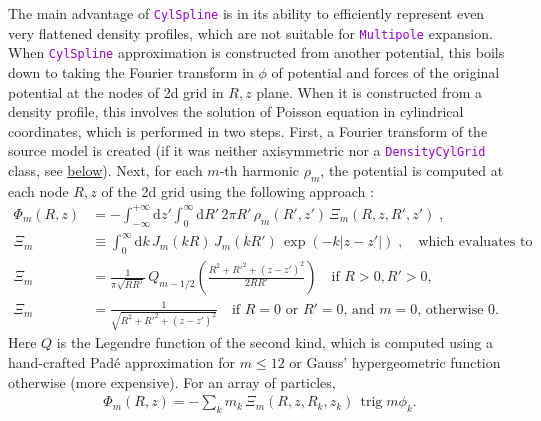 \documentclass[12pt]{article}
\newcommand{\ttt}[1]{\textcolor{darkviolet}{\texttt{#1}}}
\renewcommand{\d}{\mathrm{d}}
\DeclareMathOperator{\trig}{trig}
\begin{document}
The main advantage of \ttt{CylSpline} is in its ability to efficiently represent even very flattened density profiles, which are not suitable for \ttt{Multipole} expansion. When \ttt{CylSpline} approximation is constructed from another potential, this boils down to taking the Fourier transform in $\phi$ of potential and forces of the original potential at the nodes of 2d grid in $R,z$ plane. When it is constructed from a density profile, this involves the solution of Poisson equation in cylindrical coordinates, which is performed in two steps. First, a Fourier transform of the source model is created (if it was neither axisymmetric nor a \ttt{DensityCylGrid} class, see \hyperref[sec:DensityCylGrid]{below}). Next, for each $m$-th harmonic $\rho_m$, the potential is computed at each node $R,z$ of the 2d grid using the following approach \cite{CohlTohline1999}:
\begin{align}
\Phi_m(R,z) &= -\int_{-\infty}^{+\infty} \d z' \int_0^{\infty} \d R' \,2\pi R'\,\rho_m(R',z')  
  \,\Xi_m(R,z,R',z')\;,  \label{eq:PoissonCylindric} \\
\Xi_m &\equiv \int_0^\infty \d k\, J_m(kR)\, J_m(kR')\, \exp(-k|z-z'|) \;,\quad
  \mbox{which evaluates to} \\
\Xi_m&= \frac{1}{\pi\sqrt{RR'}}\, Q_{m-1/2}\left( \frac{R^2+R'^2+(z-z')^2}{2RR'} \right) \quad
  \mbox{if }R>0,R'>0,  \nonumber \\
\Xi_m&= \frac{1}{\sqrt{R^2+R'^2+(z-z')^2}}\quad
  \mbox{if }R=0\mbox{ or }R'=0\mbox{, and }m=0\mbox{, otherwise 0}. \nonumber
\end{align}
Here $Q$ is the Legendre function of the second kind, which is computed using a hand-crafted Pad\'e approximation for $m\le 12$ or Gauss' hypergeometric function otherwise (more expensive).
For an array of particles, 
\begin{align}  \label{eq:PoissonCylindricParticles}
\Phi_m(R,z) = -\sum_k m_k\,\Xi_m(R,z,R_k,z_k)\,\trig m\phi_k .
\end{align}
\end{document}
